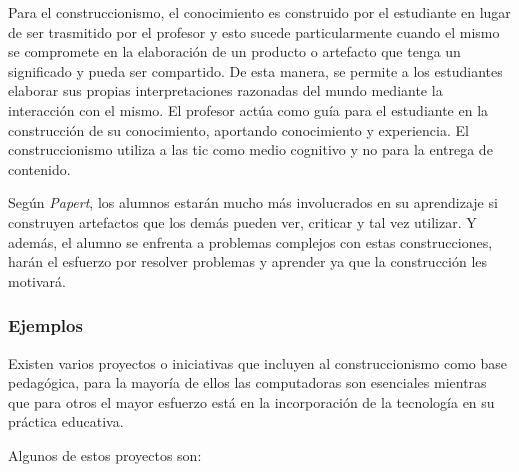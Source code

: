 Para el construccionismo, el conocimiento es construido por el estudiante en
lugar de ser trasmitido por el profesor\cite{moses:2003} y esto sucede
particularmente cuando el mismo se compromete en la elaboración de un producto o
artefacto que tenga un significado y pueda ser compartido\cite{valdivia:sg}. De
esta manera, se permite a los estudiantes elaborar sus propias interpretaciones
razonadas del mundo mediante la interacción con el mismo. El profesor actúa como
guía para el estudiante en la construcción de su conocimiento, aportando
conocimiento y experiencia. El construccionismo utiliza a las \gls{tic} como
medio cognitivo y no para la entrega de contenido\cite{sasha:construtivism}.

Según \textit{Papert}, los alumnos estarán mucho más involucrados en su
aprendizaje si construyen artefactos que los demás pueden ver, criticar y tal
vez utilizar. Y además, el alumno se enfrenta a problemas complejos con estas
construcciones, harán el esfuerzo por resolver problemas y aprender ya que la
construcción les motivará\cite{const:vs}.

\subsubsection{Ejemplos} 

Existen varios proyectos o iniciativas que incluyen al construccionismo como
base pedagógica, para la mayoría de ellos las computadoras son esenciales
mientras que para otros el mayor esfuerzo está en la incorporación de la
tecnología en su práctica educativa\cite{papertian:const}.

Algunos de estos proyectos son:

